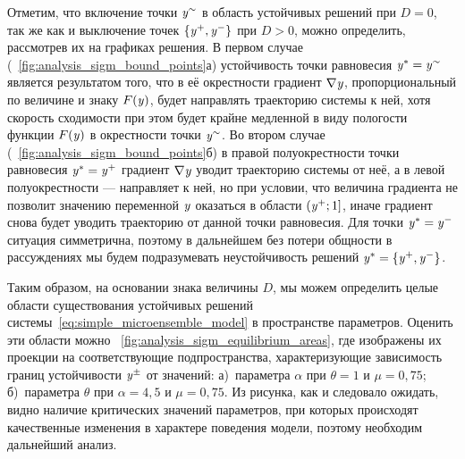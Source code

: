 Отметим, что включение точки $\mathit{y}^{\sim}$ в область устойчивых решений при $D = 0$, так же как и выключение точек $\left\{\mathit{y}^{+}, \mathit{y}^{-}\right\}$ при $D > 0$, можно определить, рассмотрев их на графиках решения. В первом случае (\seefigure~\ref{fig:analysis_sigm_bound_points}а) устойчивость точки равновесия $\mathit{y}^{*} = \mathit{y}^{\sim}$ является результатом того, что в её окрестности градиент $\nabla\mathit{y}$, пропорциональный по величине и знаку $F(\mathit{y})$, будет направлять траекторию системы к ней, хотя скорость сходимости при этом будет крайне медленной в виду пологости функции $F(\mathit{y})$ в окрестности точки $\mathit{y}^{\sim}$. Во втором случае (\seefigure~\ref{fig:analysis_sigm_bound_points}б) в правой полуокрестности точки равновесия $\mathit{y}^{*} = \mathit{y}^{+}$ градиент $\nabla\mathit{y}$ уводит траекторию системы от неё, а в левой полуокрестности --- направляет к ней, но при условии, что величина градиента не позволит значению переменной $\mathit{y}$ оказаться в области $\left(\mathit{y}^{+}; 1\right]$, иначе градиент снова будет уводить траекторию от данной точки равновесия. Для точки $\mathit{y}^{*} = \mathit{y}^{-}$ ситуация симметрична, поэтому в дальнейшем без потери общности в рассуждениях мы будем подразумевать неустойчивость решений $\mathit{y}^{*} = \left\{\mathit{y}^{+}, \mathit{y}^{-}\right\}$.

Таким образом, на основании знака величины $D$, мы можем определить целые области существования устойчивых решений системы~\eqref{eq:simple_microensemble_model} в пространстве параметров. Оценить эти области можно \onfigure~\ref{fig:analysis_sigm_equilibrium_areas}, где изображены их проекции на соответствующие подпространства, характеризующие зависимость границ устойчивости $\mathit{y}^{\pm}$ от значений: а)~параметра $\alpha$ при $\theta = 1$ и $\mu = 0,75$; б)~параметра $\theta$ при $\alpha = 4,5$ и $\mu = 0,75$. Из рисунка, как и следовало ожидать, видно наличие критических значений параметров, при которых происходят качественные изменения в характере поведения модели, поэтому необходим дальнейший анализ.

